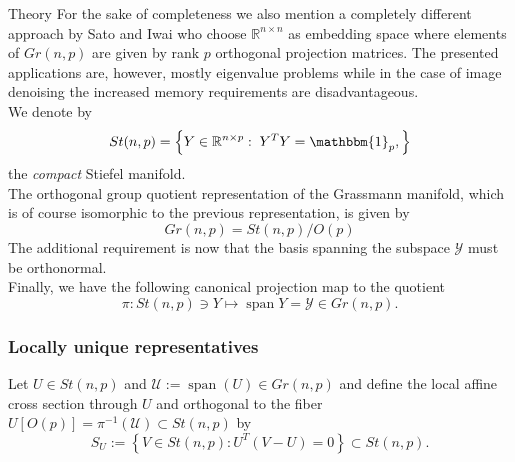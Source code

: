 \begin{chapter}{Theory}
For the sake of completeness we also mention a completely different approach by Sato and Iwai \cite{Sato2014} who choose $\mathbb{R}^{n\times n}$ as embedding space
where elements of $Gr(n,p)$ are given by rank $p$ orthogonal projection matrices. The presented applications are, however, mostly eigenvalue problems while in the case
of image denoising the increased memory requirements are disadvantageous.\\

We denote by 
\begin{equation}
St(n,p)=\left\lbrace Y\in\mathbb{R}^{n\times p}:\; Y^TY=\mathbbm{1}_p,\right\rbrace
\end{equation}
the \emph{compact} Stiefel manifold.\\

The orthogonal group quotient representation of the Grassmann manifold, which is of course isomorphic to the previous representation, is given by
\begin{equation}
    Gr(n,p) = St(n,p) / O(p) %
\end{equation}
The additional requirement is now that the basis spanning the subspace $\mathcal{Y}$ must be orthonormal. \\

Finally, we have the following canonical projection map to the quotient
\begin{equation}
    \pi : St(n,p)\ni Y \mapsto \operatorname{span} Y=\mathcal{Y} \in Gr(n, p).
\end{equation}

\subsubsection{Locally unique representatives} %
\label{ssub:Locally unique Representative}
Let $U\in St(n,p)$ and $\mathcal{U}:=\operatorname{span}(U) \in Gr(n,p)$ and define the local affine cross section through $U$ and orthogonal to the fiber $U[O(p)]=\pi^{-1}(\mathcal{U})\subset St(n,p)$ by
\begin{equation}
    S_U := \left\lbrace V\in St(n,p): U^T(V-U)=0 \right\rbrace\subset St(n,p).
\end{equation}


\end{chapter}

